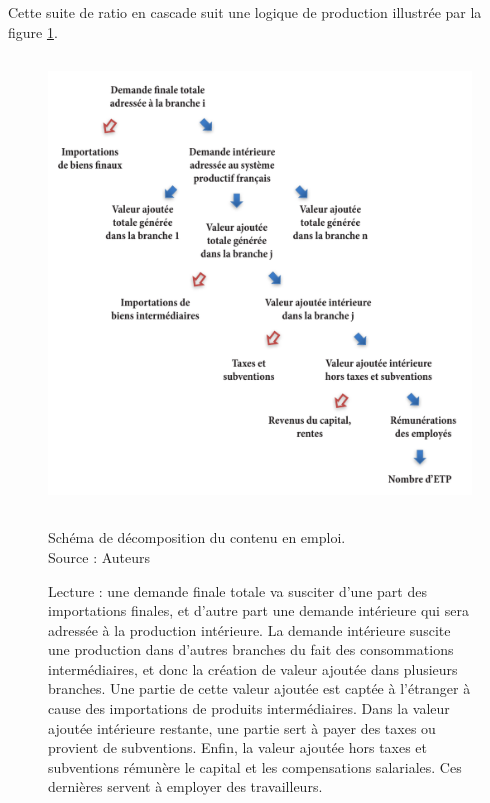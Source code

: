 Cette suite de ratio en cascade suit une logique de production illustrée par la figure \ref{fig:schema_decompo}.

\begin{figure}[!hb]
	\centering
	\includegraphics[height=12cm]{figures/Schema_decompo/schema_decompo.pdf}
	\caption{Schéma de décomposition du contenu en emploi. \\Source : Auteurs}
	\label{fig:schema_decompo}
	\captionsetup{justification=raggedright}
	\caption*{Lecture : une demande finale totale va susciter d’une part des importations finales, et d’autre part une demande intérieure qui sera adressée à la production intérieure. La demande intérieure suscite une production dans d’autres branches du fait des consommations intermédiaires, et donc la création de valeur ajoutée dans plusieurs branches. Une partie de cette valeur ajoutée est captée à l’étranger à cause des importations de produits intermédiaires. Dans la valeur ajoutée intérieure restante, une partie sert à payer des taxes ou provient de subventions. Enfin, la valeur ajoutée hors taxes et subventions rémunère le capital et les compensations salariales. Ces dernières servent à employer des travailleurs.}
\end{figure}

